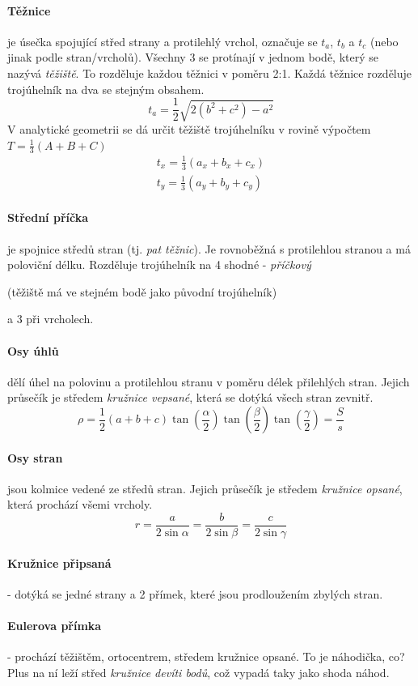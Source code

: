 \documentclass[12pt]{article}
\begin{document}
\paragraph{Těžnice} je úsečka spojující střed strany a protilehlý vrchol, označuje se $t_a$, $t_b$ a $t_c$ (nebo jinak podle stran/vrcholů). Všechny 3 se protínají v jednom bodě, který se nazývá \emph{těžiště}. To rozděluje každou těžnici v poměru 2:1. Každá těžnice rozděluje trojúhelník na dva se stejným obsahem.
\begin{equation}
t_a = \frac{1}{2}\sqrt{2\left(b^2+c^2\right)-a^2}
\end{equation}
V analytické geometrii se dá určit těžiště trojúhelníku v rovině výpočtem $T = \frac{1}{3}(A + B+ C)$
\begin{align}
t_x = \frac{1}{3}\left( a_x + b_x + c_x \right) \\
t_y = \frac{1}{3}\left( a_y + b_y + c_y \right)
\end{align}
\paragraph{Střední příčka} je spojnice středů stran (tj. \emph{pat těžnic}). Je rovnoběžná s protilehlou stranou a má poloviční délku. Rozděluje trojúhelník na 4 shodné - \emph{příčkový} \begin{scriptsize}
(těžiště má ve stejném bodě jako původní trojúhelník)
\end{scriptsize}
a 3 při vrcholech.
\paragraph{Osy úhlů} dělí úhel na polovinu a protilehlou stranu v poměru délek přilehlých stran. Jejich průsečík je středem \emph{kružnice vepsané}, která se dotýká všech stran zevnitř.
\begin{equation}
\rho = \frac{1}{2}(a+b+c) \tan\left( \frac{\alpha}{2} \right) \tan\left( \frac{\beta}{2} \right) \tan\left( \frac{\gamma}{2} \right) = \frac{S}{s}
\end{equation}
\paragraph{Osy stran} jsou kolmice vedené ze středů stran. Jejich průsečík je středem \emph{kružnice opsané}, která prochází všemi vrcholy.
\begin{equation}
r = \frac{a}{2\sin \alpha} = \frac{b}{2\sin \beta} = \frac{c}{2\sin \gamma}
\end{equation}
\begin{scriptsize}
\paragraph{Kružnice připsaná} - dotýká se jedné strany a 2 přímek, které jsou prodloužením zbylých stran.
\paragraph{Eulerova přímka} - prochází těžištěm,  ortocentrem, středem kružnice opsané. To je náhodička, co? Plus na ní leží střed \emph{kružnice devíti bodů}, což vypadá taky jako shoda náhod.
\end{scriptsize}
\end{document}
